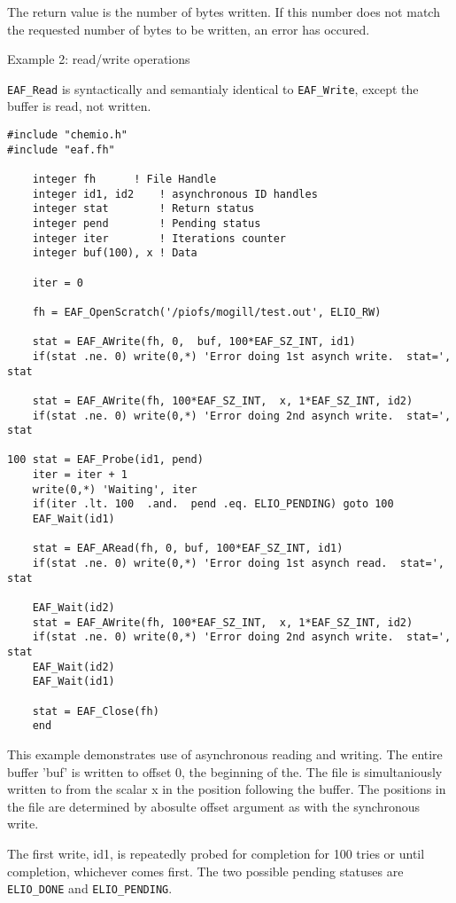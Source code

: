 The return value is the number of bytes written. If this number does not
match the requested number of bytes to be written, an error has occured.

Example 2: read/write operations

{\tt EAF\_Read} is syntactically and semantialy identical to {\tt EAF\_Write}, except the
buffer is read, not written.

\begin{verbatim}
#include "chemio.h"
#include "eaf.fh"

	integer fh 		! File Handle
	integer id1, id2 	! asynchronous ID handles
	integer stat		! Return status
	integer pend		! Pending status
	integer iter		! Iterations counter
	integer buf(100), x	! Data

	iter = 0

	fh = EAF_OpenScratch('/piofs/mogill/test.out', ELIO_RW)

	stat = EAF_AWrite(fh, 0,  buf, 100*EAF_SZ_INT, id1)
	if(stat .ne. 0) write(0,*) 'Error doing 1st asynch write.  stat=', stat

	stat = EAF_AWrite(fh, 100*EAF_SZ_INT,  x, 1*EAF_SZ_INT, id2)
	if(stat .ne. 0) write(0,*) 'Error doing 2nd asynch write.  stat=', stat

100	stat = EAF_Probe(id1, pend)
	iter = iter + 1
	write(0,*) 'Waiting', iter
	if(iter .lt. 100  .and.  pend .eq. ELIO_PENDING) goto 100
	EAF_Wait(id1)

	stat = EAF_ARead(fh, 0, buf, 100*EAF_SZ_INT, id1)
	if(stat .ne. 0) write(0,*) 'Error doing 1st asynch read.  stat=', stat

	EAF_Wait(id2)
	stat = EAF_AWrite(fh, 100*EAF_SZ_INT,  x, 1*EAF_SZ_INT, id2)
	if(stat .ne. 0) write(0,*) 'Error doing 2nd asynch write.  stat=', stat
	EAF_Wait(id2)
	EAF_Wait(id1)

	stat = EAF_Close(fh)
	end
\end{verbatim}

This example demonstrates use of asynchronous reading and writing.  The
entire buffer 'buf' is written to offset 0, the beginning of the.  The file
is simultaniously written to from the scalar x in the position following the
buffer.  The positions in the file are determined by abosulte offset argument
as with the synchronous write.

The first write, id1, is repeatedly probed for completion for 100 tries or
until completion, whichever comes first.  The two possible pending statuses
are {\tt ELIO\_DONE} and {\tt ELIO\_PENDING}.

